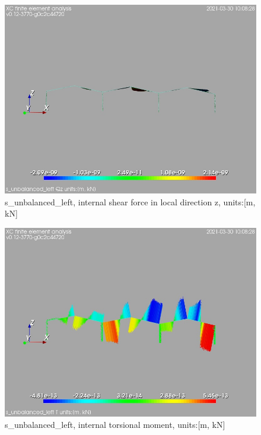 \begin{figure}
\begin{center}
\includegraphics[width=\linewidth]{calc_results/sole_zeinali/text/graphics/resSimplLC/s_unbalanced_leftallMemberSetQz}
\caption{s_unbalanced_left, internal shear force in local direction z, units:[m, kN]}
\end{center}
\end{figure}
\begin{figure}
\begin{center}
\includegraphics[width=\linewidth]{calc_results/sole_zeinali/text/graphics/resSimplLC/s_unbalanced_leftallMemberSetT}
\caption{s_unbalanced_left, internal torsional moment, units:[m, kN]}
\end{center}
\end{figure}
